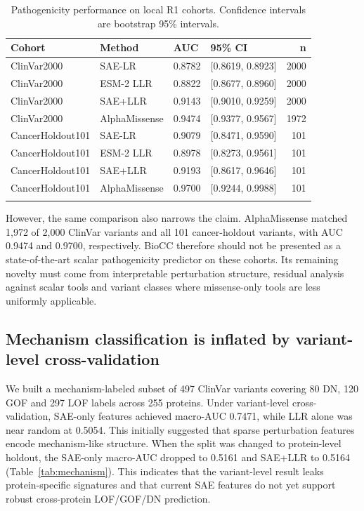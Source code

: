 \documentclass[pdflatex,sn-nature]{sn-jnl}
\begin{document}
\begin{table}[h]
\caption{Pathogenicity performance on local R1 cohorts. Confidence intervals are bootstrap 95\% intervals.}\label{tab:pathogenicity}
\begin{tabular}{@{}llllr@{}}
\toprule
Cohort & Method & AUC & 95\% CI & n \\
\midrule
ClinVar2000 & SAE-LR & 0.8782 & [0.8619, 0.8923] & 2000 \\
ClinVar2000 & ESM-2 LLR & 0.8822 & [0.8677, 0.8960] & 2000 \\
ClinVar2000 & SAE+LLR & 0.9143 & [0.9010, 0.9259] & 2000 \\
ClinVar2000 & AlphaMissense & 0.9474 & [0.9377, 0.9567] & 1972 \\
CancerHoldout101 & SAE-LR & 0.9079 & [0.8471, 0.9590] & 101 \\
CancerHoldout101 & ESM-2 LLR & 0.8978 & [0.8273, 0.9561] & 101 \\
CancerHoldout101 & SAE+LLR & 0.9193 & [0.8617, 0.9646] & 101 \\
CancerHoldout101 & AlphaMissense & 0.9700 & [0.9244, 0.9988] & 101 \\
\botrule
\end{tabular}
\end{table}

However, the same comparison also narrows the claim. AlphaMissense matched 1,972 of 2,000 ClinVar variants and all 101 cancer-holdout variants, with AUC 0.9474 and 0.9700, respectively. BioCC therefore should not be presented as a state-of-the-art scalar pathogenicity predictor on these cohorts. Its remaining novelty must come from interpretable perturbation structure, residual analysis against scalar tools and variant classes where missense-only tools are less uniformly applicable.

\subsection{Mechanism classification is inflated by variant-level cross-validation}

We built a mechanism-labeled subset of 497 ClinVar variants covering 80 DN, 120 GOF and 297 LOF labels across 255 proteins. Under variant-level cross-validation, SAE-only features achieved macro-AUC 0.7471, while LLR alone was near random at 0.5054. This initially suggested that sparse perturbation features encode mechanism-like structure. When the split was changed to protein-level holdout, the SAE-only macro-AUC dropped to 0.5161 and SAE+LLR to 0.5164 (Table~\ref{tab:mechanism}). This indicates that the variant-level result leaks protein-specific signatures and that current SAE features do not yet support robust cross-protein LOF/GOF/DN prediction.
\end{document}
